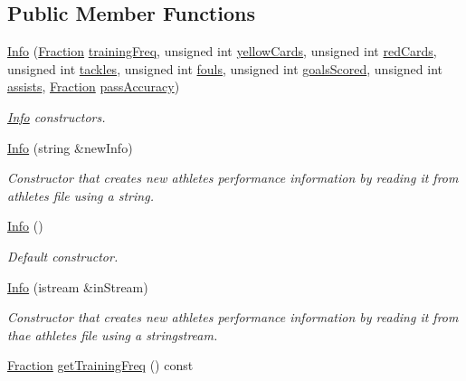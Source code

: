 \subsection*{Public Member Functions}
\begin{DoxyCompactItemize}
\item 
\hyperlink{class_info_a9eb23cc9b0bc2edee5977ec55f1717e2}{Info} (\hyperlink{class_fraction}{Fraction} \hyperlink{class_info_ae893be5aad319de5d911c3f80cc0a2d4}{training\+Freq}, unsigned int \hyperlink{class_info_aabdfdb282f3ceaae1772574bf2b3cd86}{yellow\+Cards}, unsigned int \hyperlink{class_info_a953c30accc7e6ff301542adfd5824f38}{red\+Cards}, unsigned int \hyperlink{class_info_aecdd57d96490b16a0c2590dd8f34009e}{tackles}, unsigned int \hyperlink{class_info_a2f90c84ba67c0e225dd58cdc14ab7f3d}{fouls}, unsigned int \hyperlink{class_info_a5ad5f72833856502b9c1f6ea50a98619}{goals\+Scored}, unsigned int \hyperlink{class_info_a1c0340af11df3407946b0ffdaae28864}{assists}, \hyperlink{class_fraction}{Fraction} \hyperlink{class_info_a37ee53dc8ae9a9656206e7eb389c6392}{pass\+Accuracy})
\begin{DoxyCompactList}\small\item\em \hyperlink{class_info}{Info} constructors. \end{DoxyCompactList}\item 
\hyperlink{class_info_a2c2d563e5bbaf12ece3b3de638f87a89}{Info} (string \&new\+Info)
\begin{DoxyCompactList}\small\item\em Constructor that creates new athlete\textquotesingle{}s performance information by reading it from athletes file using a string. \end{DoxyCompactList}\item 
\hyperlink{class_info_a89823cdd427a9dfdf3d2e43d938222bd}{Info} ()
\begin{DoxyCompactList}\small\item\em Default constructor. \end{DoxyCompactList}\item 
\hyperlink{class_info_a45dbc59e7e008bcc1849f0260ea2d64f}{Info} (istream \&in\+Stream)
\begin{DoxyCompactList}\small\item\em Constructor that creates new athlete\textquotesingle{}s performance information by reading it from thae athletes file using a stringstream. \end{DoxyCompactList}\item 
\hyperlink{class_fraction}{Fraction} \hyperlink{class_info_ace20d53ed24c8288e7e2fab3d4c4faa1}{get\+Training\+Freq} () const

\end{DoxyCompactItemize}
